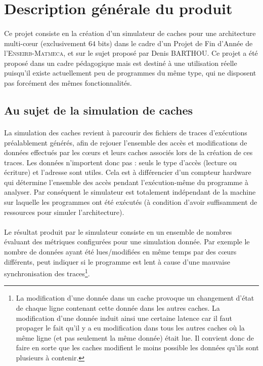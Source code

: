 \section{Description générale du produit}

\paragraph{}
Ce projet consiste en la création d'un simulateur de caches pour une architecture multi-c\oe ur (exclusivement $64$ bits) dans le cadre d'un Projet de Fin d'Année de l'\textsc{Enseirb-Matmeca}, et sur le sujet proposé par Denis BARTHOU. Ce projet a été proposé dans un cadre pédagogique mais est destiné à une utilisation réelle puisqu'il existe actuellement peu de programmes du même type, qui ne disposent pas forcément des mêmes fonctionnalités.

\subsection{Au sujet de la simulation de caches}

\paragraph{}
La simulation des caches revient à parcourir des fichiers de traces d'exécutions préalablement générés, afin de rejouer l'ensemble des accès et modifications de données effectués par les c\oe urs et leurs caches associés lors de la création de ces traces. Les données n'importent donc pas : seuls le type d'accès (lecture ou écriture) et l'adresse sont utiles. Cela est à différencier d'un compteur hardware qui détermine l'ensemble des accès pendant l'exécution-même du programme à analyser. Par conséquent le simulateur est totalement indépendant de la machine sur laquelle les programmes ont été exécutés (à condition d'avoir suffisamment de ressources pour simuler l'architecture).   

\paragraph{}
Le résultat produit par le simulateur consiste en un ensemble de nombres évaluant des métriques configurées pour une simulation donnée. Par exemple le nombre de données ayant été lues/modifiées en même temps par des c\oe urs différents, peut indiquer si le programme est lent à cause d'une mauvaise synchronisation des traces\footnote{La modification d'une donnée dans un cache provoque un changement d'état de chaque ligne contenant cette donnée dans les autres caches. La modification d'une donnée induit ainsi une certaine latence car il faut propager le fait qu'il y a eu modification dans tous les autres caches où la même ligne (et pas seulement la même donnée) était lue. Il convient donc de faire en sorte que les caches modifient le moins possible les données qu'ils sont plusieurs à contenir.}.

